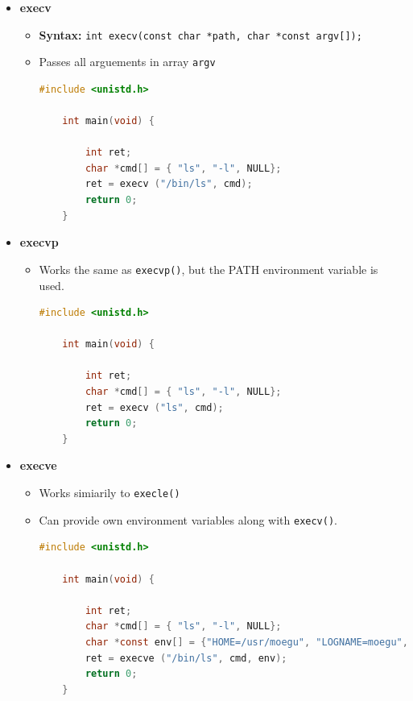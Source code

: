 \documentclass[12pt]{article}
\begin{document}
\begin{enumerate}[1.]
\begin{itemize}
        \item \textbf{execv}
        \begin{itemize}
            \item \textbf{Syntax:} \texttt{int execv(const char *path, char *const argv[]);}
            \item Passes all arguements in array \texttt{argv}

\begin{lstlisting}[language=c]
    #include <unistd.h>

    int main(void) {

        int ret;
        char *cmd[] = { "ls", "-l", NULL};
        ret = execv ("/bin/ls", cmd);
        return 0;
    }
\end{lstlisting}
        \end{itemize}

        \item \textbf{execvp}

        \begin{itemize}
            \item Works the same as \texttt{execvp()}, but the PATH environment variable is used.


\begin{lstlisting}[language=c]
    #include <unistd.h>

    int main(void) {

        int ret;
        char *cmd[] = { "ls", "-l", NULL};
        ret = execv ("ls", cmd);
        return 0;
    }
\end{lstlisting}
        \end{itemize}
        \item \textbf{execve}
        \begin{itemize}
            \item Works simiarily to \texttt{execle()}
            \item Can provide own environment variables along with \texttt{execv()}.


\begin{lstlisting}[language=c]
    #include <unistd.h>

    int main(void) {

        int ret;
        char *cmd[] = { "ls", "-l", NULL};
        char *const env[] = {"HOME=/usr/moegu", "LOGNAME=moegu", NULL};
        ret = execve ("/bin/ls", cmd, env);
        return 0;
    }
\end{lstlisting}
        \end{itemize}
    \end{itemize}


\end{enumerate}
\end{document}
